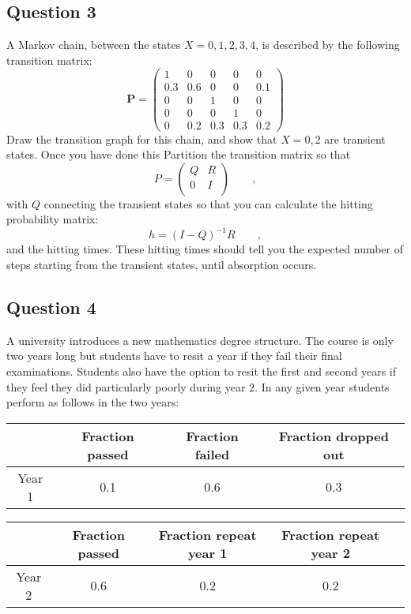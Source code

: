 \documentclass[a4paper]{article}
\begin{document}
\subsection{Question 3}

A Markov chain, between the states $X=0,1,2,3,4$,
 is  described by the following  transition matrix:
$$
\mathbf{P} = \left(
  \begin{matrix}
   1 & 0 & 0 & 0 &  0 \\
   0.3 & 0.6 & 0 & 0 & 0.1 \\
    0 & 0 & 1 & 0 & 0 \\
    0 & 0 & 0 & 1 & 0 \\
    0 & 0.2 & 0.3 & 0.3 & 0.2
  \end{matrix}
  \right)
$$
Draw the transition graph for this chain, and show that $X=0,2$ are transient states.
Once you have done this Partition the transition matrix so that
$$
P =
\left(
\begin{matrix}
Q & R \\
0  & I \\
\end{matrix}
\right)
\qquad ,
$$
with $Q$  connecting the transient states so that you can calculate the
hitting probability matrix:
$$
h = (I-Q)^{-1}R \qquad ,
$$
and the hitting times.  These hitting times should tell you the expected number of steps
starting from the transient states, until absorption occurs.

\subsection{Question 4}


A university introduces a new mathematics degree structure. The course is
only two years long but students have to resit a year if they fail their final
examinations.  Students also have the option to resit the first and second
years if they feel they did particularly poorly during year 2.  In any given
year students perform as follows in the two years:
%
\begin{center}
\begin{tabular}{ c | c c c } 
 & Fraction passed & Fraction failed & Fraction dropped out \\ \hline
 Year 1 & 0.1 & 0.6 & 0.3 \\ 
\end{tabular}

\vspace{1cm}

\begin{tabular}{ c | c c c c }
  & Fraction passed & Fraction repeat year 1 & Fraction repeat year 2 \\ \hline
Year 2 & 0.6 & 0.2 & 0.2 
\end{tabular}
\end{center}
\end{document}

